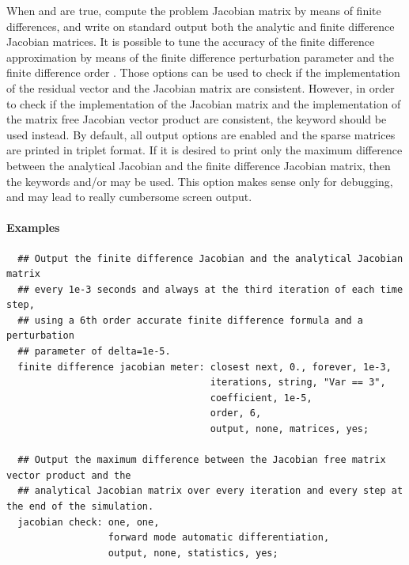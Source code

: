\noindent
When  and  are true,
compute the problem Jacobian matrix by means of finite differences,
and write on standard output both the analytic and finite difference Jacobian matrices.
It is possible to tune the accuracy of the finite difference approximation by means of
the finite difference perturbation parameter  and the finite difference order .
Those options can be used to check if the implementation of the residual vector and the Jacobian matrix
are consistent. However, in order to check if the implementation of the Jacobian matrix
and the implementation of the matrix free Jacobian vector product are consistent,
the keyword  should be used instead.
By default, all output options are enabled and the sparse matrices are printed in triplet format.
If it is desired to print only the maximum difference between the analytical Jacobian
and the finite difference Jacobian matrix, then the keywords  and/or  may be used.
This option makes sense only for debugging, and may lead to really cumbersome screen output.

\paragraph{Examples}
\begin{Verbatim}
  ## Output the finite difference Jacobian and the analytical Jacobian matrix
  ## every 1e-3 seconds and always at the third iteration of each time step,
  ## using a 6th order accurate finite difference formula and a perturbation
  ## parameter of delta=1e-5.
  finite difference jacobian meter: closest next, 0., forever, 1e-3,
                                    iterations, string, "Var == 3",
                                    coefficient, 1e-5,
                                    order, 6,
                                    output, none, matrices, yes;

  ## Output the maximum difference between the Jacobian free matrix vector product and the
  ## analytical Jacobian matrix over every iteration and every step at the end of the simulation.
  jacobian check: one, one,
                  forward mode automatic differentiation,
                  output, none, statistics, yes;
\end{Verbatim}

